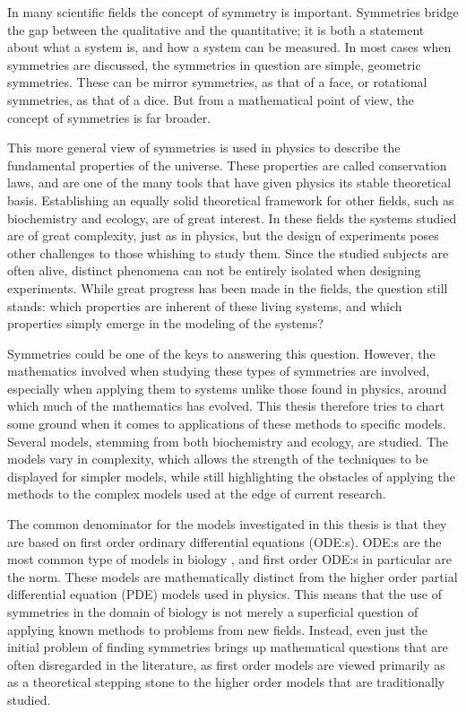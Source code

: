 
In many scientific fields the concept of symmetry is important.
Symmetries bridge the gap between the qualitative and the quantitative; it is both a statement about what a system is, and how a system can be measured.
In most cases when symmetries are discussed, the symmetries in question are simple, geometric symmetries.
These can be mirror symmetries, as that of a face, or rotational symmetries, as that of a dice.
But from a mathematical point of view, the concept of symmetries is far broader.

This more general view of symmetries is used in physics to describe the fundamental properties of the universe.
These properties are called conservation laws, and are one of the many tools that have given physics its stable theoretical basis.
Establishing an equally solid theoretical framework for other fields, such as biochemistry and ecology, are of great interest.
In these fields the systems studied are of great complexity, just as in physics, but the design of experiments poses other challenges to those whishing to study them.
Since the studied subjects are often alive, distinct phenomena can not be entirely isolated when designing experiments.
While great progress has been made in the fields, the question still stands: which properties are inherent of these living systems, and which properties simply emerge in the modeling of the systems?

Symmetries could be one of the keys to answering this question.
However, the mathematics involved when studying these types of symmetries are involved, especially when applying them to systems unlike those found in physics, around which much of the mathematics has evolved.
This thesis therefore tries to chart some ground when it comes to applications of these methods to specific models.
Several models, stemming from both biochemistry and ecology, are studied.
The models vary in complexity, which allows the strength of the techniques to be displayed for simpler models, while still highlighting the obstacles of applying the methods to the complex models used at the edge of current research.

The common denominator for the models investigated in this thesis is that they are based on first order ordinary differential equations (ODE:s).
ODE:s are the most common type of models in biology \cite{maliksheriff2020biomodels,biomodels}, and first order ODE:s in particular are the norm.
These models are mathematically distinct from the higher order partial differential equation (PDE) models used in physics.
This means that the use of symmetries in the domain of biology is not merely a superficial question of applying known methods to problems from new fields.
Instead, even just the initial problem of finding symmetries brings up mathematical questions that are often disregarded in the literature, as first order models are viewed primarily as as a theoretical stepping stone to the higher order models that are traditionally studied.

